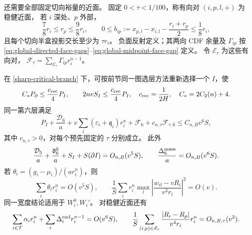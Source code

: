 还需要全部固定切向裕量的近面。
固定 \(0<\tau<1/100\)，称有向对 \((i,p,l,+)\) 为稳健近面，
若 \(i\) 深处、\(p\) 外部，
\[
 \frac78r_i\le r_p\le\frac98r_i,\qquad
 0\le b_{ip}:=x_{p,l}-x_{i,l}-\frac{r_i+r_p}{2}\le\frac18r_i,
\]
且每个切向半盒投影交长至少为 \(\tau r_i\)。
负面反射定义；其两向 CDF 余量及 \(\Gamma_{ip}\)
按 \eqref{eq:global-directed-face-gaps}--\eqref{eq:global-midpoint-face-gap} 定义。
令 \(\mathscr E_\tau\) 为这些有向对，
\(\mathcal F_\tau=\sum_{\mathscr E_\tau}\Gamma_{ip}r_i^{n-1}\)。

\begin{lemma}[六层临界先验]\label{sharp-critical}
在 \eqref{sharp-critical-branch} 下，可按前节同一图选层方法重新选择一个 \(I\)，使
\begin{equation}\label{sharp-graph-absorption}
 C_*P_\partial\le\frac{c_{\rm rec}}4P_I,\qquad
 2nvS_I\le\frac{c_{\rm rec}}4P_I,
 \quad c_{\rm rec}=\frac1{2H},\quad C_*=2C_2(n)+4.
\end{equation}
同一第六层满足
\begin{equation}\label{sharp-positive-prior}
 P_I+\frac{\mathcal D_6}{a}
 +v\sum_i(\varepsilon_i+\mathfrak q_i)r_i^n
 +\mathcal F_6+c_{n,\tau}\mathcal F_{\tau,6}
 \le C_{n,B}v^6S,
\end{equation}
其中 \(c_{n,\tau}>0\)，对每个预先固定的 \(\tau\) 分别成立。
此外
\begin{equation}\label{sharp-mass-prior}
 \frac{\mathcal D_5}{a}+\frac{\mathfrak d_6^0}{a}
       +S_I+S(\partial I)=O_{n,B}(v^5S),\qquad
 \frac{\Delta_6^{\rm mass}}a=O_{n,B}(v^6S).
\end{equation}
若 \(\theta_i=(g_i-\mu_i)/(ar_i^n)\)，则
\begin{equation}\label{sharp-width-tightness}
 \sum_i\theta_i r_i^n=O(v^5S),\qquad
 \frac1S\sum_i r_i^n
 \max_l\left|\frac{w_{il}-vR_i}{v^3r_i}\right|^2=O(v).
\end{equation}
同一宽度结论适用于 \(W_i^0,W_i'\)。
对稳健近面还有
\begin{equation}\label{sharp-face-tightness}
 \sum_{i\in\mathcal T}\alpha_i r_i^n
       +\sum_i\Delta_i^{\rm end}r_i^{n-1}=O(v^6S),\qquad
 \frac1S\sum_{(i,p)\in\mathscr E_\tau}
 \frac{|R_i-R_p|}{v^4r_i}r_i^n=O_{n,B,\tau}(v^2).
\end{equation}
\end{lemma}
